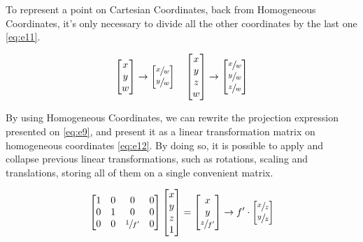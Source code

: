 \documentclass{article}
\begin{document}
To represent a point on Cartesian Coordinates, back from Homogeneous Coordinates, it's only necessary to divide all the other coordinates by the last one \eqref{eq:e11}.

\begin{alignat}{2}
\begin{bmatrix}
x  \\
y  \\
w
\end{bmatrix} \rightarrow
\begin{bmatrix}
\sfrac{x}{w}  \\
\sfrac{y}{w}  \\
\end{bmatrix} \quad
\begin{bmatrix}
x  \\
y  \\
z  \\
w
\end{bmatrix} \rightarrow
\begin{bmatrix}
\sfrac{x}{w}  \\
\sfrac{y}{w}  \\
\sfrac{z}{w}
\end{bmatrix} \label{eq:e11}
\end{alignat}

By using Homogeneous Coordinates, we can rewrite the projection expression presented on \eqref{eq:e9}, and present it as a linear transformation matrix on homogeneous coordinates \eqref{eq:e12}. By doing so, it is possible to apply and collapse previous linear transformations, such as rotations, scaling and translations, storing all of them on a single convenient matrix. 

\begin{alignat}{2}
\begin{bmatrix}
1 & 0 & 0 & 0  \\
0 & 1 & 0 & 0  \\
0 & 0 & \sfrac{1}{f'} & 0
\end{bmatrix}
\begin{bmatrix}
x  \\
y  \\
z \\
1
\end{bmatrix} =
\begin{bmatrix}
x  \\
y  \\
\sfrac{z}{f'}
\end{bmatrix} \rightarrow
f' \cdot \begin{bmatrix}
\sfrac{x}{z}  \\
\sfrac{y}{z}
\end{bmatrix} \label{eq:e12}
\end{alignat}
\end{document}
